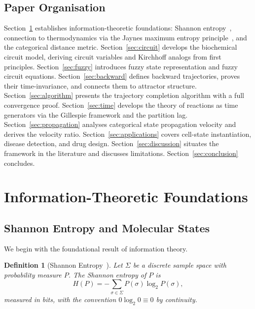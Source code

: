 \documentclass[twocolumn,10pt,a4paper]{article}
\newtheorem{definition}[theorem]{Definition}
\begin{document}
\subsection{Paper Organisation}
\label{sec:intro-org}

Section~\ref{sec:info} establishes information-theoretic foundations:
Shannon entropy~\cite{Shannon1948}, connection to thermodynamics via the Jaynes
maximum entropy principle~\cite{Jaynes1957}, and the categorical distance
metric.  Section~\ref{sec:circuit} develops the biochemical circuit model,
deriving circuit variables and Kirchhoff analogs from first principles.
Section~\ref{sec:fuzzy} introduces fuzzy state representation and fuzzy circuit
equations.  Section~\ref{sec:backward} defines backward trajectories, proves
their time-invariance, and connects them to attractor structure.
Section~\ref{sec:algorithm} presents the trajectory completion algorithm with
a full convergence proof.  Section~\ref{sec:time} develops the theory of
reactions as time generators via the Gillespie framework and the partition lag.
Section~\ref{sec:propagation} analyses categorical state propagation velocity
and derives the velocity ratio.  Section~\ref{sec:applications} covers
cell-state instantiation, disease detection, and drug design.
Section~\ref{sec:discussion} situates the framework in the literature and
discusses limitations.  Section~\ref{sec:conclusion} concludes.

\section{Information-Theoretic Foundations}
\label{sec:info}

\subsection{Shannon Entropy and Molecular States}
\label{sec:info-shannon}

We begin with the foundational result of information theory.

\begin{definition}[Shannon Entropy~\protect\cite{Shannon1948}]
\label{def:shannon}
Let $\Sigma$ be a discrete sample space with probability measure $P$.  The
\emph{Shannon entropy} of $P$ is
\begin{equation}
  H(P) = -\sum_{\sigma\in\Sigma} P(\sigma)\log_2 P(\sigma),
  \label{eq:shannon}
\end{equation}
measured in bits, with the convention $0\log_2 0\equiv 0$ by continuity.
\end{definition}
\end{document}
